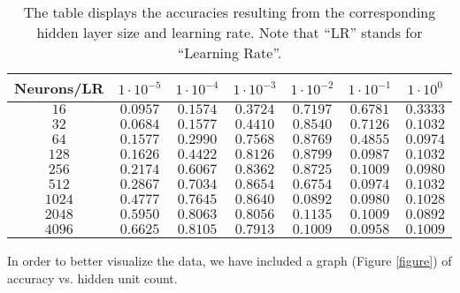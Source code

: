 \documentclass[a4paper]{article}
\begin{document}
\begin{table}[h]
 \caption{The table displays the accuracies resulting from the corresponding hidden layer size and learning rate. Note that ``LR'' stands for ``Learning Rate''.}
 \label{table}
 \begin{center}
  \begin{tabular}{c|cccccc}
    \hline \hline
    Neurons/LR &
        $1\cdot10^{-5}$ &
        $1\cdot10^{-4}$ &
        $1\cdot10^{-3}$ &
        $1\cdot10^{-2}$ &
        $1\cdot10^{-1}$ &
        $1\cdot10^{0}$ \\
    \hline
    $16$   & $0.0957$ & $0.1574$ & $0.3724$ & $0.7197$ & $0.6781$ & $0.3333$ \\
    $32$   & $0.0684$ & $0.1577$ & $0.4410$ & $0.8540$ & $0.7126$ & $0.1032$ \\
    $64$   & $0.1577$ & $0.2990$ & $0.7568$ & $0.8769$ & $0.4855$ & $0.0974$ \\
    $128$  & $0.1626$ & $0.4422$ & $0.8126$ & $0.8799$ & $0.0987$ & $0.1032$ \\
    $256$  & $0.2174$ & $0.6067$ & $0.8362$ & $0.8725$ & $0.1009$ & $0.0980$ \\
    $512$  & $0.2867$ & $0.7034$ & $0.8654$ & $0.6754$ & $0.0974$ & $0.1032$ \\
    $1024$ & $0.4777$ & $0.7645$ & $0.8640$ & $0.0892$ & $0.0980$ & $0.1028$ \\
    $2048$ & $0.5950$ & $0.8063$ & $0.8056$ & $0.1135$ & $0.1009$ & $0.0892$ \\
    $4096$ & $0.6625$ & $0.8105$ & $0.7913$ & $0.1009$ & $0.0958$ & $0.1009$ \\
    \hline \hline
  \end{tabular}
 \end{center}
\end{table}

In order to better visualize the data, we have included a graph
(Figure \ref{figure}) of accuracy vs. hidden unit count.
\end{document}
